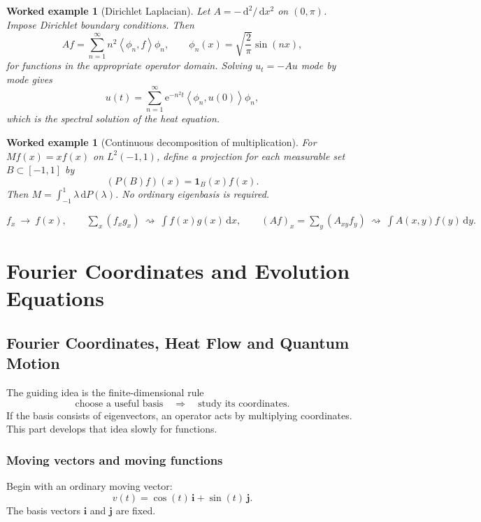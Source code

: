 \documentclass[11pt,a5paper,oneside,openany]{scrreprt}
\theoremstyle{notes}
\theoremstyle{definitions}
\newtheorem{example}[theorem]{Worked example}
\newcommand{\ip}[2]{\left\langle #1,#2\right\rangle}
\newcommand{\dd}{\,\mathrm{d}}
\newcommand{\e}{\mathrm{e}}
\newcommand{\one}{\mathbf{1}}
\begin{document}
\begin{example}[Dirichlet Laplacian]
Let $A=-\dd^2/\dd x^2$ on $(0,\pi)$.
Impose Dirichlet boundary conditions.  Then
\[
 Af=\sum_{n=1}^{\infty}n^2\ip{\phi_n}{f}\phi_n,
 \qquad
 \phi_n(x)=\sqrt{\frac2\pi}\sin(nx),
\]
for functions in the appropriate operator domain.  Solving
$u_t=-Au$ mode by mode gives
\[
 u(t)=\sum_{n=1}^{\infty}\e^{-n^2t}\ip{\phi_n}{u(0)}\phi_n,
\]
which is the spectral solution of the heat equation.
\end{example}

\begin{example}[Continuous decomposition of multiplication]
For $M f(x)=x f(x)$ on $L^2(-1,1)$, define a projection for each measurable
set $B\subset[-1,1]$ by
\[
 (P(B)f)(x)=\one_B(x)f(x).
\]
Then $M=\int_{-1}^{1}\lambda\dd P(\lambda)$.  No ordinary eigenbasis is
required.
\end{example}

\begin{summarybox}
\centering
$\displaystyle
f_x\ \longrightarrow\ f(x),\qquad
\sum_x(f_xg_x)\ \rightsquigarrow\ \int f(x)g(x)\dd x,
\qquad
(Af)_x=\sum_y(A_{xy}f_y)\ \rightsquigarrow\
\int A(x,y)f(y)\dd y.$
\end{summarybox}

\part{Fourier Coordinates and Evolution Equations}
\chapter{Fourier Coordinates, Heat Flow and Quantum Motion}
\label{part:fourier-applications}

\begin{summarybox}
The guiding idea is the finite-dimensional rule
\[
 \boxed{\text{choose a useful basis}
 \quad\Longrightarrow\quad
 \text{study its coordinates}.}
\]
If the basis consists of eigenvectors, an operator acts by multiplying
coordinates.  This part develops that idea slowly for functions.
\end{summarybox}

\section{Moving vectors and moving functions}

Begin with an ordinary moving vector:
\[
 v(t)=\cos(t)\,\mathbf i+\sin(t)\,\mathbf j.
\]
The basis vectors $\mathbf i$ and $\mathbf j$ are fixed.
\end{document}
